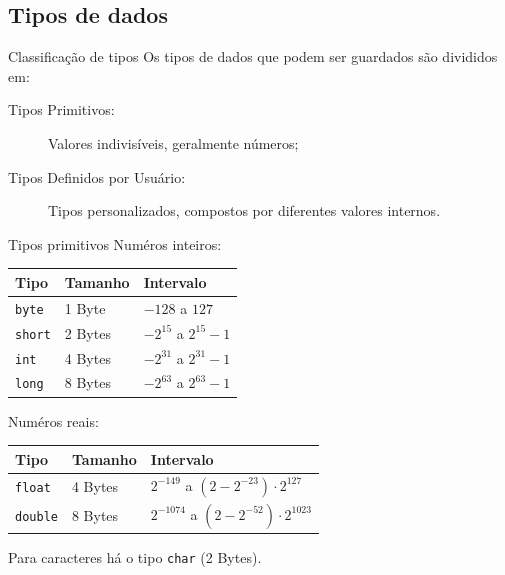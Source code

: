 \documentclass{beamer}
\begin{document}
\subsection{Tipos de dados}
\begin{frame}{Classificação de tipos}
    Os tipos de dados que podem ser guardados são divididos em:

    \begin{description}
        \item[Tipos Primitivos:] Valores indivisíveis, geralmente números;
        \item[Tipos Definidos por Usuário:] Tipos personalizados, compostos por
            diferentes valores internos.
    \end{description}
\end{frame}

\begin{frame}{Tipos primitivos}
    Numéros inteiros:
    \begin{center}
        \begin{tabular}{lll}
            \toprule
            Tipo           & Tamanho & Intervalo \\
            \midrule
            \texttt{byte}  & 1 Byte  & $-128$ a $127$ \\
            \texttt{short} & 2 Bytes & $-2^{15}$ a $2^{15}-1$ \\
            \texttt{int}   & 4 Bytes & $-2^{31}$ a $2^{31}-1$ \\
            \texttt{long}  & 8 Bytes & $-2^{63}$ a $2^{63}-1$ \\
            \bottomrule
        \end{tabular}
    \end{center}

    Numéros reais:
    \begin{center}
        \begin{tabular}{lll}
            \toprule
            Tipo            & Tamanho & Intervalo \\
            \midrule
            \texttt{float}  & 4 Bytes & $2^{-149}$ a $(2-2^{-23}) \cdot 2^{127}$ \\
            \texttt{double} & 8 Bytes & $2^{-1074}$ a $(2-2^{-52}) \cdot 2^{1023}$ \\
            \bottomrule
        \end{tabular}
    \end{center}

    Para caracteres há o tipo \texttt{char} (2 Bytes).
\end{frame}
\end{document}
